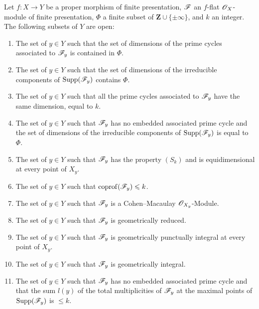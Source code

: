 \begin{theorem}[12.2.1]
\label{IV.12.2.1}
Let $f:X\to Y$ be a proper morphism of finite presentation, $\mathscr{F}$ an $f$-flat $\mathscr{O}_X$-module of finite presentation, $\Phi$ a finite subset of $\mathbf{Z}\cup\{\pm\infty\}$, and $k$ an integer.
The following subsets of $Y$ are open:
\begin{enumerate}[label=\textup{(\roman*)}]
  \item The set of $y\in Y$ such that the set of dimensions of the prime cycles associated to $\mathscr{F}_y$ is contained in $\Phi$.
  \item The set of $y\in Y$ such that the set of dimensions of the irreducible components of $\operatorname{Supp}(\mathscr{F}_y)$ contains $\Phi$.
  \item The set of $y\in Y$ such that all the prime cycles associated to $\mathscr{F}_y$ have the same dimension, equal to $k$.
  \item The set of $y\in Y$ such that $\mathscr{F}_y$ has no embedded associated prime cycle and the set of dimensions of the irreducible components of $\operatorname{Supp}(\mathscr{F}_y)$ is equal to $\Phi$.
  \item The set of $y\in Y$ such that $\mathscr{F}_y$ has the property $(S_k)$ and is equidimensional at every point of $X_y$.
  \item The set of $y\in Y$ such that $\operatorname{coprof}(\mathscr{F}_y)\leqslant k$.
  \item The set of $y\in Y$ such that $\mathscr{F}_y$ is a Cohen--Macaulay $\mathscr{O}_{X_y}$-Module.
  \item The set of $y\in Y$ such that $\mathscr{F}_y$ is geometrically reduced.
  \item The set of $y\in Y$ such that $\mathscr{F}_y$ is geometrically punctually integral at every point of $X_y$.
  \item The set of $y\in Y$ such that $\mathscr{F}_y$ is geometrically integral.
  \item The set of $y\in Y$ such that $\mathscr{F}_y$ has no embedded associated prime cycle and that the sum $l(y)$ of the total multiplicities  of $\mathscr{F}_y$ at the maximal points of $\operatorname{Supp}(\mathscr{F}_y)$ is $\leqslant k$.
\end{enumerate}
\end{theorem}

